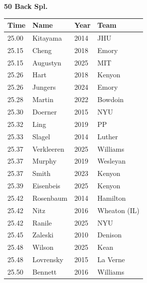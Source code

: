 \noindent\begin{minipage}[t]{0.98\textwidth}
\centering
\textbf{\textcolor{teamprimary}{50 Back Spl.}}\par
\vspace{0.5em}
\centering
\small
\renewcommand{\arraystretch}{1.0}
\setlength{\tabcolsep}{4pt}
\begin{tabular}{@{}p{2.5cm}p{4.5cm}p{1.5cm}p{2.5cm}@{}}
\toprule
\textbf{Time} & \textbf{Name} & \textbf{Year} & \textbf{Team} \\
\midrule
25.00 & Kitayama & 2014 & JHU \\
25.15 & Cheng & 2018 & Emory \\
25.15 & Augustyn & 2025 & MIT \\
25.26 & Hart & 2018 & Kenyon \\
25.26 & Jungers & 2024 & Emory \\
25.28 & Martin & 2022 & Bowdoin \\
25.30 & Doerner & 2015 & NYU \\
25.32 & Ling & 2019 & PP \\
25.33 & Slagel & 2014 & Luther \\
25.37 & Verkleeren & 2025 & Williams \\
25.37 & Murphy & 2019 & Wesleyan \\
25.37 & Smith & 2023 & Kenyon \\
25.39 & Eisenbeis & 2025 & Kenyon \\
25.42 & Rosenbaum & 2014 & Hamilton \\
25.42 & Nitz & 2016 & Wheaton (IL) \\
25.42 & Ranile & 2025 & NYU \\
25.45 & Zaleski & 2010 & Denison \\
25.48 & Wilson & 2025 & Kean \\
25.48 & Lovrensky & 2015 & La Verne \\
25.50 & Bennett & 2016 & Williams \\
\bottomrule
\end{tabular}
\end{minipage}
\vspace{1.2em}

